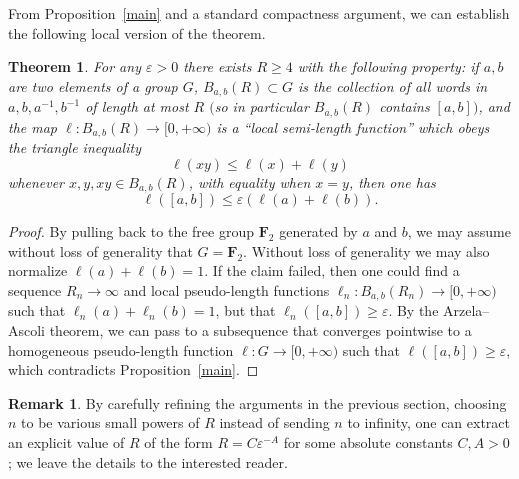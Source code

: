 \documentclass[11pt,a4paper,reqno]{amsart}
\numberwithin{equation}{section}
\theoremstyle{plain}
\newtheorem{theorem}[equation]{Theorem}
\theoremstyle{definition}
\newtheorem{remark}[equation]{Remark}
\newcommand\eps{\varepsilon}
\newcommand\normsymb{\ell}  %
\newcommand\norm[1]{\ell({#1})}   %
\newcommand\normn[1]{\ell_n({#1})}   %
\newcommand\free[1]{\mathbf{F}_{#1}}
\begin{document}
From Proposition~\ref{main} and a standard compactness argument, we can
establish the following local version of the theorem.

\begin{theorem}
For any $\eps>0$ there exists $R \geq 4$ with the following property: if
$a,b$ are two elements of a group $G$, $B_{a,b}(R) \subset G$ is the
collection of all words in $a,b,a^{-1},b^{-1}$ of length at most $R$
\textup{$($}so in particular $B_{a,b}(R)$ contains $[a,b]$\textup{$)$},
and the map $\normsymb: B_{a,b}(R) \to [0,+\infty)$ is a ``local
{ semi}-length function'' which obeys the triangle inequality
\begin{equation}\label{tri}
 \norm{ xy } \leq \norm{x} + \norm{y}
\end{equation}
whenever $x,y,xy \in B_{a,b}(R)$, with equality when $x=y$, then one has
\[
\norm{ [a,b] } \leq \eps ( \norm{a} + \norm{b} ).
\]
\end{theorem}

\begin{proof}
By pulling back to the free group $\free{2}$ generated by $a$ and $b$, we
may assume without loss of generality that $G = \free{2}$.  Without loss
of generality we may also normalize $\norm{a}+\norm{b}=1$.  If the claim
failed, then one could find a sequence $R_n \to \infty$ and local
pseudo-length functions $\normsymb_n: B_{a,b}(R_n) \to [0,+\infty)$ such
that $\normn{a}+\normn{b} = 1$, but that $\normn{[a,b]} \geq \eps$.  By
the Arzela--Ascoli theorem, we can pass to a subsequence that converges
pointwise to a homogeneous pseudo-length function $\normsymb: G \to
[0,+\infty)$ such that $\norm{[a,b]} \geq \eps$, which contradicts
Proposition~\ref{main}.
\end{proof}

\begin{remark}
By carefully refining the arguments in the previous section, choosing $n$
to be various small powers of $R$ instead of sending $n$ to infinity, one
can extract an explicit value of $R$ of the form $R = C \eps^{-A}$ for
some absolute constants $C, A > 0$; we leave the details to the
interested reader.
\end{remark}
\end{document}
